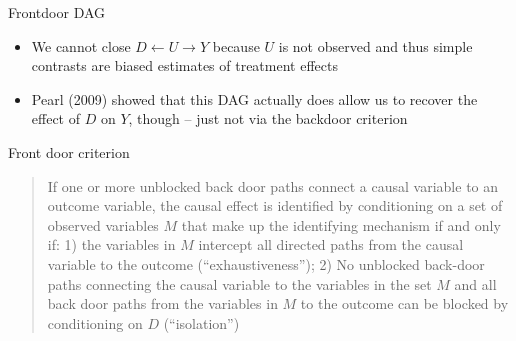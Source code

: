 \documentclass{beamer}
\begin{document}
\begin{frame}{Frontdoor DAG}

  \begin{center}
  \end{center}

  \begin{itemize}
    \item We cannot close $D \leftarrow U \rightarrow Y$ because $U$ is not observed and thus simple contrasts are biased estimates of treatment effects
    \item Pearl (2009) showed that this DAG actually does allow us to recover the effect of $D$ on $Y$, though -- just not via the backdoor criterion
  \end{itemize}

\end{frame}

\begin{frame}{Front door criterion}

  \begin{quote}
    If one or more unblocked back door paths connect a causal variable to an outcome variable, the causal effect is identified by conditioning on a set of observed variables $M$ that make up the identifying mechanism if and only if: 1) the variables in $M$ intercept all directed paths from the causal variable to the outcome (``exhaustiveness''); 2) No unblocked back-door paths connecting the causal variable to the variables in the set $M$ and all back door paths from the variables in $M$ to the outcome can be blocked by conditioning on $D$ (``isolation'')
  \end{quote}

\end{frame}
\end{document}
